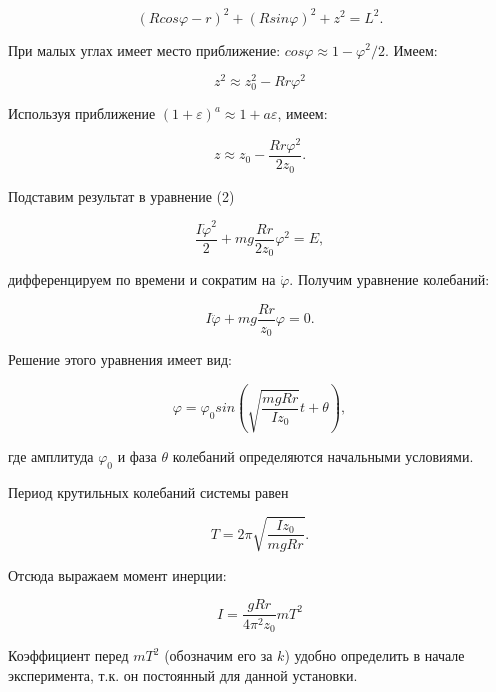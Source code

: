 \documentclass{report}
\begin{document}
	\begin{equation}
		(Rcos\varphi - r)^{2} + (Rsin\varphi)^{2} + z^{2} = L^{2}.
	\end{equation}
	
	При малых углах имеет место приближение: $cos\varphi \approx 1 - \varphi^{2}/2$. Имеем:
	
	\begin{equation}
	z^{2} \approx z_{0}^{2} - Rr\varphi^{2}	
	\end{equation}
	
	Используя приближение $(1+\varepsilon)^{a} \approx 1+a\varepsilon$, имеем:
	
	\begin{equation}
		z \approx z_{0} - \dfrac{Rr\varphi^{2}}{2z_{0}}.
	\end{equation}
	
	Подставим результат в уравнение (2)
	
	\begin{equation}
		\dfrac{I \dot{\varphi}^{2}}{2} + mg\dfrac{Rr}{2z_{0}}\varphi^{2} = E,
	\end{equation}
	
	дифференцируем по времени и сократим на $\dot{\varphi}$. Получим уравнение колебаний:
	
	\begin{equation}
		I \ddot{\varphi} + mg\dfrac{Rr}{z_{0}}\varphi = 0.
	\end{equation}
	
	Решение этого уравнения имеет вид:
	
	\begin{equation}
		\varphi = \varphi_{0} sin(\sqrt{\dfrac{mgRr}{Iz_{0}}} t + \theta),
	\end{equation}
	
	где амплитуда $\varphi_{0}$ и фаза $\theta$ колебаний определяются начальными условиями.
	
	Период крутильных колебаний системы равен
	
	\begin{equation}
		T = 2\pi \sqrt{\dfrac{Iz_{0}}{mgRr}}.
	\end{equation}
	
	Отсюда выражаем момент инерции:
	
	\begin{equation}
		\boxed{I = \dfrac{gRr}{4\pi^{2}z_{0}}mT^{2}} 
	\end{equation}
	
	Коэффициент перед $mT^{2}$ (обозначим его за $k$) удобно определить в начале эксперимента, т.к. он постоянный для данной установки.
	
\end{document}
